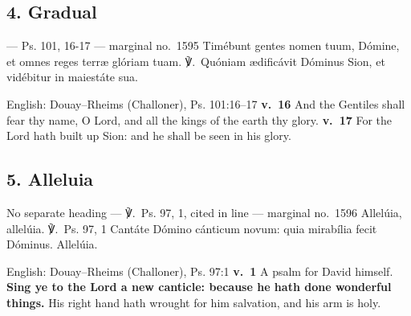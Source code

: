 \elementguard
\subsection*{4. Gradual }

\begin{appointedlatin}{ --- Ps. 101, 16-17 --- marginal no.\ 1595}
Timébunt gentes nomen tuum, Dómine, et omnes reges terræ glóriam tuam.
℣.~Quóniam ædificávit Dóminus Sion, et vidébitur in maiestáte sua.
\end{appointedlatin}

\begin{namedtranslation}{English: Douay--Rheims (Challoner), Ps. 101:16--17}
\textbf{v.~16} And the Gentiles shall fear thy name, O Lord, and all the kings
of the earth thy glory. \textbf{v.~17} For the Lord hath built up Sion: and he
shall be seen in his glory.
\end{namedtranslation}


\elementguard
\subsection*{5. Alleluia }

\begin{appointedlatin}{No separate heading --- ℣.~Ps. 97, 1, cited in line --- marginal no.\ 1596}
Allelúia, allelúia. ℣.~\textnormal{Ps. 97, 1} Cantáte Dómino cánticum novum:
quia mirabília fecit Dóminus. Allelúia.
\end{appointedlatin}

\begin{namedtranslation}{English: Douay--Rheims (Challoner), Ps. 97:1}
\textbf{v.~1} A psalm for David himself. \textbf{Sing ye to the Lord a new
canticle: because he hath done wonderful things.} His right hand hath wrought
for him salvation, and his arm is holy.
\end{namedtranslation}


